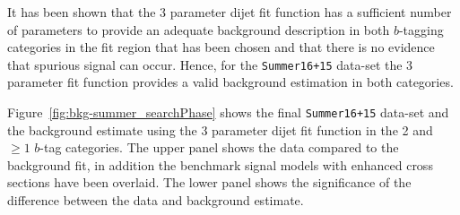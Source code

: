It has been shown that the 3 parameter dijet fit function has a
sufficient number of parameters to provide an adequate background
description in both $b$-tagging categories in the fit region that has been chosen
and that there is no evidence that spurious signal can occur.
Hence, for the \verb|Summer16+15| data-set the 3 parameter fit function
provides a valid background estimation in both categories.

Figure~\ref{fig:bkg-summer_searchPhase} shows the final
\verb|Summer16+15| data-set and the background estimate using the 3 parameter dijet fit function
in the 2 and $\geq1$ $b$-tag categories.
The upper panel shows the data compared to the background fit,
in addition the benchmark signal models with enhanced cross sections have been overlaid.
The lower panel shows the significance of the difference between the data and background estimate.



